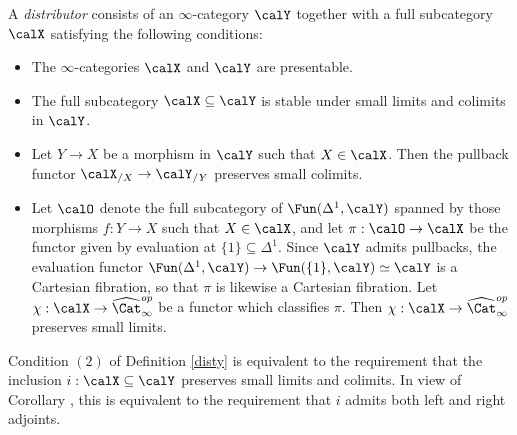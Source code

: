 \begin{definition}\label{disty}
A {\it distributor} consists of an $\infty$-category $\calY$ together with a full subcategory $\calX$ satisfying the following conditions:
\begin{itemize}
\item[$(1)$] The $\infty$-categories $\calX$ and $\calY$ are presentable.

\item[$(2)$] The full subcategory $\calX \subseteq \calY$ is stable under small limits and colimits
in $\calY$.

\item[$(3)$] Let $Y \rightarrow X$ be a morphism in $\calY$ such that $X \in \calX$. Then the pullback functor $\calX_{/X} \rightarrow \calY_{/Y}$ preserves small colimits.

\item[$(4)$] 
Let $\calO$ denote the full subcategory of $\Fun( \Delta^1, \calY)$ spanned by those
morphisms $f: Y \rightarrow X$ such that $X \in \calX$, and let $\pi: \calO \rightarrow \calX$ be the functor given by evaluation at $\{1\} \subseteq \Delta^1$. Since $\calY$ admits pullbacks, the evaluation functor 
$\Fun( \Delta^1, \calY ) \rightarrow \Fun( \{1\}, \calY) \simeq \calY$ is a Cartesian fibration, so that
$\pi$ is likewise a Cartesian fibration. Let $\chi: \calX \rightarrow \widehat{\Cat}^{op}_{\infty}$ be a functor which classifies $\pi$. Then $\chi: \calX \rightarrow \widehat{\Cat}_{\infty}^{op}$ preserves small limits.
\end{itemize}
\end{definition}

\begin{remark}\label{cavem2}
Condition $(2)$ of Definition \ref{disty} is equivalent to the requirement that the inclusion
$i: \calX \subseteq \calY$ preserves small limits and colimits. In view of Corollary , this is equivalent to the requirement that $i$ admits both left and right adjoints.
\end{remark}


